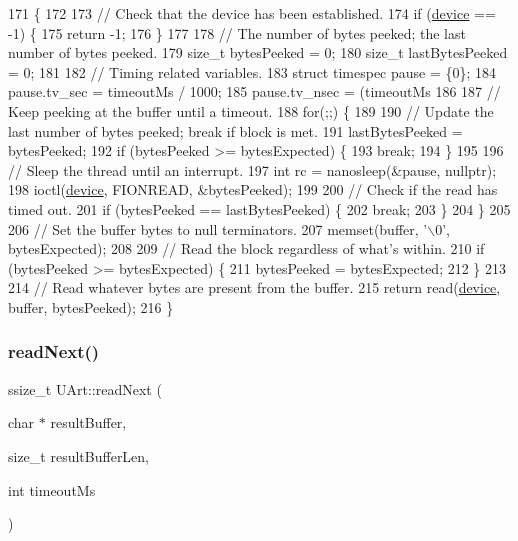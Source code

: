 \begin{DoxyCode}
171 \{
172 
173     \textcolor{comment}{// Check that the device has been established.}
174     \textcolor{keywordflow}{if} (\hyperlink{class_u_art_a61fb55cc7c92c85f2219dffcfb58bc12}{device} == -1) \{
175         \textcolor{keywordflow}{return} -1;
176     \}
177 
178     \textcolor{comment}{// The number of bytes peeked; the last number of bytes peeked.}
179     \textcolor{keywordtype}{size\_t} bytesPeeked = 0;
180     \textcolor{keywordtype}{size\_t} lastBytesPeeked = 0;
181 
182     \textcolor{comment}{// Timing related variables.}
183     \textcolor{keyword}{struct }timespec pause = \{0\};
184     pause.tv\_sec = timeoutMs / 1000;
185     pause.tv\_nsec = (timeoutMs %
186 
187     \textcolor{comment}{// Keep peeking at the buffer until a timeout.}
188     \textcolor{keywordflow}{for}(;;) \{
189 
190         \textcolor{comment}{// Update the last number of bytes peeked; break if block is met.}
191         lastBytesPeeked = bytesPeeked;
192         \textcolor{keywordflow}{if} (bytesPeeked >= bytesExpected) \{
193             \textcolor{keywordflow}{break};
194         \}
195 
196         \textcolor{comment}{// Sleep the thread until an interrupt.}
197         \textcolor{keywordtype}{int} rc = nanosleep(&pause, \textcolor{keyword}{nullptr});
198         ioctl(\hyperlink{class_u_art_a61fb55cc7c92c85f2219dffcfb58bc12}{device}, FIONREAD, &bytesPeeked);
199 
200         \textcolor{comment}{// Check if the read has timed out.}
201         \textcolor{keywordflow}{if} (bytesPeeked == lastBytesPeeked) \{
202             \textcolor{keywordflow}{break};
203         \}
204     \}
205 
206     \textcolor{comment}{// Set the buffer bytes to null terminators.}
207     memset(buffer, \textcolor{charliteral}{'\(\backslash\)0'}, bytesExpected);
208 
209     \textcolor{comment}{// Read the block regardless of what's within.}
210     \textcolor{keywordflow}{if} (bytesPeeked >= bytesExpected) \{
211         bytesPeeked = bytesExpected;
212     \}
213 
214     \textcolor{comment}{// Read whatever bytes are present from the buffer.}
215     \textcolor{keywordflow}{return} read(\hyperlink{class_u_art_a61fb55cc7c92c85f2219dffcfb58bc12}{device}, buffer, bytesPeeked);
216 \}
\end{DoxyCode}
\mbox{\label{class_u_art_aa4818ca67447e251680b4b8d28c8bba5}} 
\subsubsection{\texorpdfstring{read\+Next()}{readNext()}}
{\footnotesize\ttfamily ssize\+\_\+t U\+Art\+::read\+Next (\begin{DoxyParamCaption}\item[{char $\ast$}]{result\+Buffer,  }\item[{size\+\_\+t}]{result\+Buffer\+Len,  }\item[{int}]{timeout\+Ms }\end{DoxyParamCaption})}

